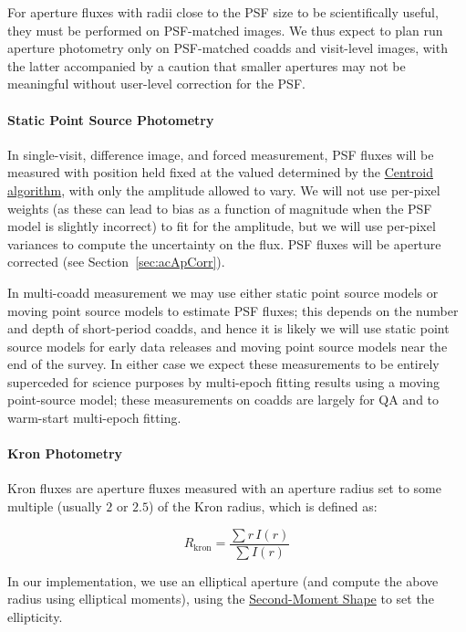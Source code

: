 For aperture fluxes with radii close to the PSF size to be scientifically useful, they must be performed on PSF-matched images.  We thus expect to plan run aperture photometry only on PSF-matched coadds and visit-level images, with the latter accompanied by a caution that smaller apertures may not be meaningful without user-level correction for the PSF.

\paragraph{Static Point Source Photometry}
\label{sec:acStaticPointSourceModels}

In single-visit, difference image, and forced measurement, PSF fluxes will be measured with position held fixed at the valued determined by the \hyperref[ac:CentroidAlgorithms]{Centroid algorithm}, with only the amplitude allowed to vary.  We will not use per-pixel weights (as these can lead to bias as a function of magnitude when the PSF model is slightly incorrect) to fit for the amplitude, but we will use per-pixel variances to compute the uncertainty on the flux.  PSF fluxes will be aperture corrected (see Section~\ref{sec:acApCorr}).

In multi-coadd measurement we may use either static point source models or moving point source models to estimate PSF fluxes; this depends on the number and depth of short-period coadds, and hence it is likely we will use static point source models for early data releases and moving point source models near the end of the survey.  In either case we expect these measurements to be entirely superceded for science purposes by multi-epoch fitting results using a moving point-source model; these measurements on coadds are largely for QA and to warm-start multi-epoch fitting.

\paragraph{Kron Photometry}
\label{sec:acKronPhotometry}

Kron fluxes are aperture fluxes measured with an aperture radius set to some multiple (usually $2$ or $2.5$) of the Kron radius, which is defined as:

$$
R_{\mathrm{kron}} = \frac{\sum r \, I(r)}{\sum I(r)}
$$

In our implementation, we use an elliptical aperture (and compute the above radius using elliptical moments), using the \hyperref[sec:acShapeAlgorithms]{Second-Moment Shape} to set the ellipticity.

